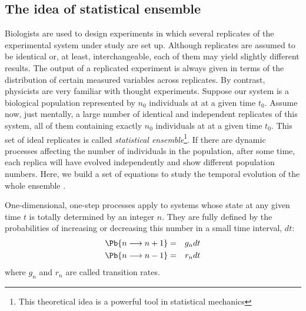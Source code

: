 \subsection{The idea of statistical ensemble}
\label{master_equation}
Biologists are used to design experiments in which several replicates of the experimental system under study are set up. Although replicates are assumed to be identical or, at least, interchangeable, each of them may yield slightly different results. The output of a replicated experiment is always given in terms of the distribution of certain measured variables across replicates. By contrast, physicists are very familiar with thought experiments. Suppose our system is a biological population represented by $n_0$ individuals at at a given time $t_0$. Assume now, just mentally, a large number of identical and independent replicates of this system, all of them containing exactly $n_0$ individuals at at a given time $t_0$. This set of ideal replicates is called {\em statistical ensemble}\footnote{This theoretical idea is a powerful tool in statistical mechanics}. If there are dynamic processes affecting the number of individuals in the population, after some time, each replica will have evolved independently and show different population numbers. Here, we build a set of equations to study the temporal evolution of the whole ensemble \citep{Allen87}. 
\smallskip

One-dimensional, one-step processes apply to systems whose state at any given time $t$ is totally determined by an integer $n$. They are fully defined by the probabilities of increasing or decreasing this number in a small time interval, $dt$:
\begin{eqnarray}
    \Pb\{ n \longrightarrow n+1 \} & = & g_n dt \nonumber\\
    \Pb\{ n \longrightarrow n-1 \} & = & r_n dt
\label{eq:pb}
\end{eqnarray}
where $g_n$ and $r_n$ are called transition rates. 
\smallskip

